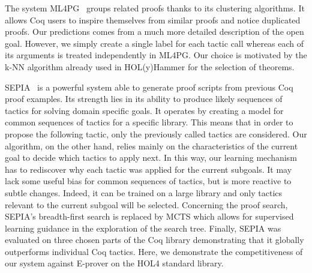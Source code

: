 \documentclass[runningheads,a4paper,draft]{svjour3}
\def\holfour{\textsf{HOL4}\xspace}
\def\coq{\textsf{Coq}\xspace}
\def\eprover{\textsf{E-prover}\xspace}
\def\holyhammer{\textsf{HOL(y)Hammer}\xspace}
\begin{document}
The system 
\textsf{ML4PG}~\cite{DBLP:journals/corr/abs-1212-3618,DBLP:journals/mics/HerasK14}
groups related proofs thanks to its clustering 
algorithms. It allows \coq users to inspire themselves from similar proofs and 
notice 
duplicated proofs. Our predictions comes from a much more detailed description 
of the open goal.
However, we simply create a single label for each tactic call whereas each of 
its
arguments is treated independently in \textsf{ML4PG}. 
Our choice is motivated by the k-NN algorithm already used in
\holyhammer for the selection of theorems.

\textsf{SEPIA}~\cite{DBLP:conf/cade/GransdenWR15} is a powerful system able to 
generate
proof scripts from previous \coq proof examples.
Its strength lies in its ability to produce likely sequences 
of tactics for solving domain specific goals. It operates by creating a model 
for common sequences of tactics for a specific library.
This means that in order to propose the following tactic, only the previously 
called tactics
are considered.
Our algorithm, on the other hand, relies mainly on the characteristics of the 
current goal 
to decide
which tactics to apply next. In this way, our learning mechanism has to 
rediscover why each 
tactic was applied for the current subgoals. It may lack some useful bias for 
common sequences 
of tactics, but is more reactive to subtle changes. Indeed, it can be trained 
on a large library and only tactics relevant to the current subgoal will be 
selected. 
Concerning the proof search, \textsf{SEPIA}'s %
breadth-first search is replaced by MCTS which allows for supervised learning
guidance in the exploration of the search tree.
Finally, \textsf{SEPIA} was evaluated on three chosen parts of the 
\coq library demonstrating that it globally outperforms individual \coq 
tactics. Here, we demonstrate the competitiveness of our system against 
\eprover on the \holfour standard library.
\end{document}
